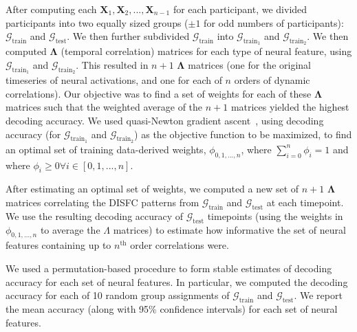 \documentclass[english]{article}
\begin{document}
After computing each
$\mathbf{X}_1, \mathbf{X}_2, ..., \mathbf{X}_{n-1}$ for each
participant, we divided participants into two equally sized groups
($\pm 1$ for odd numbers of participants):
$\mathcal{G}_{\mathrm{train}}$ and $\mathcal{G}_{\mathrm{test}}$.  We
then further subdivided $\mathcal{G}_{\mathrm{train}}$ into
$\mathcal{G}_{\mathrm{train}_1}$ and $\mathcal{G}_{\mathrm{train}_2}$.
We then computed $\mathbf{\Lambda}$ (temporal correlation) matrices
for each type of neural feature, using
$\mathcal{G}_{\mathrm{train}_1}$ and $\mathcal{G}_{\mathrm{train}_2}$.
This resulted in $n+1$ $\mathbf{\Lambda}$ matrices (one for the
original timeseries of neural activations, and one for each of $n$
orders of dynamic correlations).  Our objective was to find a set of
weights for each of these $\mathbf{\Lambda}$ matrices such that the
weighted average of the $n+1$ matrices yielded the highest decoding
accuracy.  We used quasi-Newton gradient ascent~\citep{NoceWrig06},
using decoding accuracy (for $\mathcal{G}_{\mathrm{train}_1}$ and
$\mathcal{G}_{\mathrm{train}_2}$) as the objective function to be
maximized, to find an optimal set of training data-derived weights,
$\phi_{0, 1, ..., n}$, where $\sum_{i=0}^n \phi_i = 1$ and where
$\phi_i \geq 0 \forall i \in \left[0, 1, ..., n\right]$.

After estimating an optimal set of weights, we computed a new set of
$n + 1$ $\mathbf{\Lambda}$ matrices correlating the DISFC patterns
from $\mathcal{G}_{\mathrm{train}}$ and $\mathcal{G}_{\mathrm{test}}$
at each timepoint.  We use the resulting decoding accuracy of
$\mathcal{G}_{\mathrm{test}}$ timepoints (using the weights in
$\phi_{0, 1, ..., n}$ to average the $\Lambda$ matrices) to estimate how informative
the set of neural features containing up to $n^\mathrm{th}$ order
correlations were.

We used a permutation-based procedure to form stable estimates of
decoding accuracy for each set of neural features.  In particular, we
computed the decoding accuracy for each of 10 random group assignments of
$\mathcal{G}_{\mathrm{train}}$ and $\mathcal{G}_{\mathrm{test}}$.  We
report the mean accuracy (along with 95\% confidence intervals) for each set
of neural features.
\end{document}
